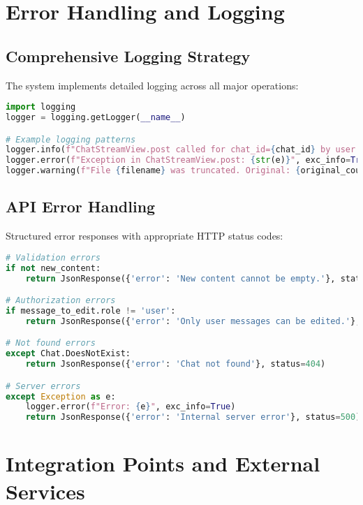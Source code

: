 \documentclass[12pt,a4paper]{article}
\begin{document}
\section{Error Handling and Logging}

\subsection{Comprehensive Logging Strategy}

The system implements detailed logging across all major operations:

\begin{lstlisting}[language=Python, caption=Logging Implementation]
import logging
logger = logging.getLogger(__name__)

# Example logging patterns
logger.info(f"ChatStreamView.post called for chat_id={chat_id} by user {user.id}")
logger.error(f"Exception in ChatStreamView.post: {str(e)}", exc_info=True)
logger.warning(f"File {filename} was truncated. Original: {original_count} chars")
\end{lstlisting}

\subsection{API Error Handling}

Structured error responses with appropriate HTTP status codes:

\begin{lstlisting}[language=Python, caption=Error Response Patterns]
# Validation errors
if not new_content:
    return JsonResponse({'error': 'New content cannot be empty.'}, status=400)

# Authorization errors
if message_to_edit.role != 'user':
    return JsonResponse({'error': 'Only user messages can be edited.'}, status=403)

# Not found errors
except Chat.DoesNotExist:
    return JsonResponse({'error': 'Chat not found'}, status=404)

# Server errors
except Exception as e:
    logger.error(f"Error: {e}", exc_info=True)
    return JsonResponse({'error': 'Internal server error'}, status=500)
\end{lstlisting}

\section{Integration Points and External Services}
\end{document}
